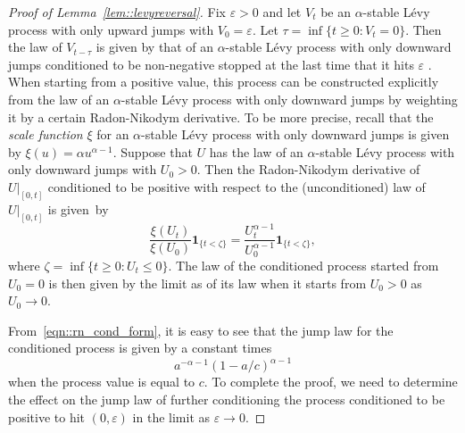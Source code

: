 \documentclass[JEP,XML,SOM,Unicode]{cedram}
\let\epsilon\varepsilon
\theoremstyle{plain}
\numberwithin{theorem}{section}
\theoremstyle{definition}
\newcommand{\one}{{\mathbf 1}}
\begin{document}
\begin{proof}[Proof of Lemma~\ref{lem::levyreversal}]
Fix $\epsilon > 0$ and let $V_t$ be an $\alpha$-stable Lévy process with only upward jumps with $V_0 = \epsilon$. Let $\tau = \inf\{t \geq 0 : V_t = 0\}$. Then the law of $V_{t-\tau}$ is given by that of an $\alpha$-stable Lévy process with only downward jumps conditioned to be non-negative stopped at the last time that it hits $\epsilon$ \cite[Chap.\,VII, Th.\,18]{bertoinlevybook}. When starting from a positive value, this process can be constructed explicitly from the law of an $\alpha$-stable Lévy process with only downward jumps by weighting it by a certain Radon-Nikodym derivative. To be more precise, recall that the \emph{scale function} \cite[Chap.\,VII.2]{bertoinlevybook} $\xi$ for an $\alpha$-stable Lévy process with only downward jumps is given by $\xi(u) = \alpha u^{\alpha-1}$. Suppose that $U$ has the law of an $\alpha$-stable Lévy process with only downward jumps with $U_0 > 0$. Then the Radon-Nikodym derivative of $U|_{[0,t]}$ conditioned to be positive with respect to the (unconditioned) law of $U|_{[0,t]}$ is given~by%
\begin{equation}
\label{eqn::rn_cond_form}
	\frac{\xi(U_t)}{\xi(U_0)} \one_{\{t < \zeta\}} = \frac{U_t^{\alpha-1}}{U_0^{\alpha-1}} \one_{\{t < \zeta\}},
\end{equation}
where $\zeta = \inf\{t \geq 0 : U_t \leq 0\}$. The law of the conditioned process started from $U_0 = 0$ is then given by the limit as of its law when it starts from $U_0 > 0$ as $U_0 \to 0$.

From~\eqref{eqn::rn_cond_form}, it is easy to see that the jump law for the conditioned process is given by a constant times
\begin{equation}
\label{eqn::cond_pos_jump_law}
a^{-\alpha-1}(1-a/c)^{\alpha-1}	
\end{equation}
when the process value is equal to $c$. To complete the proof, we need to determine the effect on the jump law of further conditioning the process conditioned to be positive to hit $(0,\epsilon)$ in the limit as $\epsilon \to 0$.


\end{proof}
\end{document}
